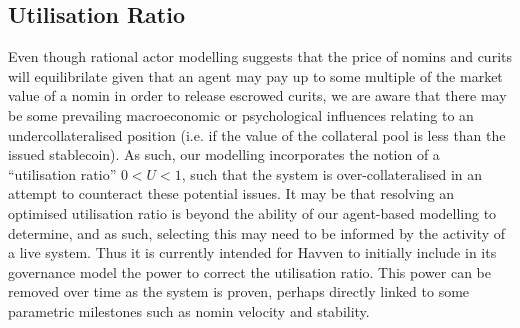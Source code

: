 \subsection{Utilisation Ratio} Even though rational actor modelling suggests that the price of nomins and curits will equilibrilate
given that an agent may pay up to some multiple of the market value of a nomin in order to release escrowed curits, we are aware that there may be some
prevailing macroeconomic or psychological influences relating to an undercollateralised position
(i.e. if the value of the collateral pool is less than the issued stablecoin). As such, our modelling incorporates the notion of a ``utilisation ratio''
\(0 < U < 1\), such that the system is over-collateralised in an attempt to counteract these potential issues. It may be that resolving an
optimised utilisation ratio is beyond the ability of our agent-based modelling to determine, and as such, selecting this may need to be
informed by the activity of a live system. Thus it is currently intended for Havven to initially include in its governance model the power
to correct the utilisation ratio. This power can be removed over time as the system is proven, perhaps directly linked to some parametric milestones such as nomin velocity and stability.


\pagebreak
